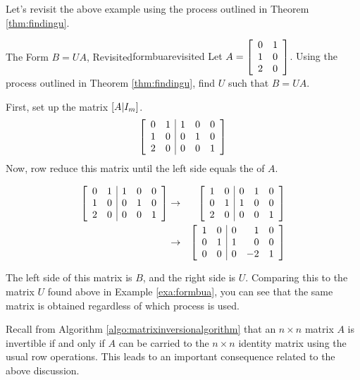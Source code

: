 Let's revisit the above example using the process outlined in Theorem \ref{thm:findingu}.

\begin{example}{The Form $B=UA$, Revisited}{formbuarevisited}
Let $A = \left[ 
\begin{array}{rr} 
0 & 1 \\
1 & 0 \\
2 & 0 
\end{array}\right]$. Using the process outlined in Theorem \ref{thm:findingu}, find $U$ such that $B=UA$. 
\end{example}

\begin{solution}
First, set up the matrix $\left[ A | I_m \right]$. 
\[
\left[ \begin{array}{rr|rrr}
0 & 1 & 1 & 0 & 0 \\
1 & 0 & 0 & 1 & 0 \\
2 & 0 & 0 & 0 & 1 
\end{array}\right]
\]
Now, row reduce this matrix until the left side equals the {\rref} of $A$. 

\begin{eqnarray*}
\left[ \begin{array}{rr|rrr}
0 & 1 & 1 & 0 & 0 \\
1 & 0 & 0 & 1 & 0 \\
2 & 0 & 0 & 0 & 1 
\end{array}\right] 
&\rightarrow& 
\left[ \begin{array}{rr|rrr}
1 & 0 & 0 & 1 & 0 \\
0 & 1 & 1 & 0 & 0 \\
2 & 0 & 0 & 0 & 1 
\end{array}\right] \\
&\rightarrow&
\left[ \begin{array}{rr|rrr}
1 & 0 & 0 & 1 & 0 \\
0 & 1 & 1 & 0 & 0 \\
0 & 0 & 0 & -2 & 1 
\end{array}\right]
\end{eqnarray*}

The left side of this matrix is $B$, and the right side is $U$. Comparing this to the matrix $U$ found above in Example \ref{exa:formbua}, you can see that the same matrix is obtained regardless of which process is used. 
\end{solution}

Recall from Algorithm \ref{algo:matrixinversionalgorithm} that an $n \times n$  matrix $A$ is invertible if and only if $A$ can be carried to the $n \times n$ identity matrix using the usual row operations. This leads to an important consequence related to the above discussion. 

